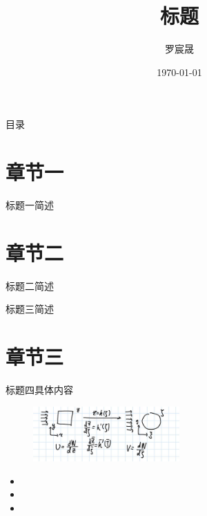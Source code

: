 \documentclass[aspectratio=169]{beamer}
\title{标题}
\author[]{罗宸晟}
\institute{北京航空航天大学中法工程师学院/国际通用工程师学院 \\ 数理实验室-复杂系统实验室}
\date{\today}
\begin{document}
\maketitle
\begin{frame}{目录}
\tableofcontents
\end{frame}
\section{章节一}
\begin{frame}[allowframebreaks]{标题一}{简述}
\zhlipsum[10]
\end{frame}

\section{章节二}
\begin{frame}[allowframebreaks]{标题二}{简述}
\zhlipsum[11]
\end{frame}
\begin{frame}[allowframebreaks]{标题三}{简述}
\zhlipsum[12]
\end{frame}

\section{章节三}

\begin{frame}[allowframebreaks]{标题四}{具体内容}
\zhlipsum[1]
\begin{figure}
    \centering
    \includegraphics[width=0.5\textwidth]{../picture/1.jpg}
\end{figure}

\zhlipsum[2]
\begin{itemize}
    \item \zhlipsum[3]
    \item \zhlipsum[4]
    \item \zhlipsum[5]
\end{itemize}
\zhlipsum[6]
\end{frame}
\end{document}
